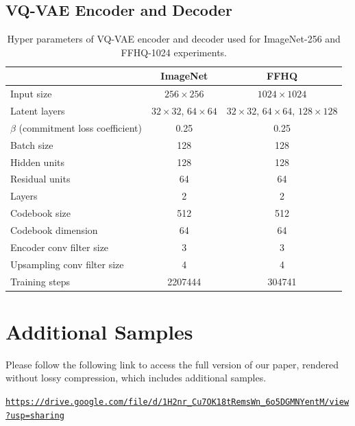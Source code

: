 \subsection{VQ-VAE Encoder and Decoder}


\begin{table}[h!]
\centering
\begin{tabular}{@{}l|cc}
             & ImageNet & FFHQ \\
\toprule
 Input size  & $256 \times 256$ & $1024 \times 1024$ \\
 Latent layers & $32\times 32$, $64\times64$ & $32\times 32$, $64\times 64$, $128\times 128$ \\
 $\beta$ (commitment loss coefficient) & 0.25 & 0.25 \\
 Batch size  & 128   & 128 \\
 Hidden units & 128 & 128 \\
 Residual units & 64 & 64 \\
 Layers  & 2 & 2 \\
 Codebook size & 512 & 512 \\
 Codebook dimension & 64 & 64 \\
 Encoder conv filter size & 3 & 3\\
 Upsampling conv filter size & 4 & 4\\
 Training steps & 2207444 & 304741 \\
\end{tabular}
\caption{Hyper parameters of VQ-VAE encoder and decoder used for ImageNet-256 and FFHQ-1024 experiments.}
\end{table}

\newpage

\section{Additional Samples}\label{app:samples}
Please follow the following link to access the full version of our paper, rendered without lossy compression, which includes additional samples.
\par
\texttt{\url{https://drive.google.com/file/d/1H2nr_Cu7OK18tRemsWn_6o5DGMNYentM/view?usp=sharing}}




